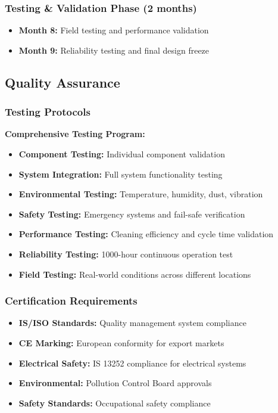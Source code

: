 \documentclass[11pt,a4paper]{article}
\begin{document}
\subsubsection{Testing \& Validation Phase (2 months)}
\begin{itemize}[leftmargin=2em]
    \item \textbf{Month 8:} Field testing and performance validation
    \item \textbf{Month 9:} Reliability testing and final design freeze
\end{itemize}

\subsection{Quality Assurance}

\subsubsection{Testing Protocols}
\begin{success}
\textbf{Comprehensive Testing Program:}
\begin{itemize}
    \item \textbf{Component Testing:} Individual component validation
    \item \textbf{System Integration:} Full system functionality testing
    \item \textbf{Environmental Testing:} Temperature, humidity, dust, vibration
    \item \textbf{Safety Testing:} Emergency systems and fail-safe verification
    \item \textbf{Performance Testing:} Cleaning efficiency and cycle time validation
    \item \textbf{Reliability Testing:} 1000-hour continuous operation test
    \item \textbf{Field Testing:} Real-world conditions across different locations
\end{itemize}
\end{success}

\subsubsection{Certification Requirements}
\begin{itemize}[leftmargin=2em]
    \item \textbf{IS/ISO Standards:} Quality management system compliance
    \item \textbf{CE Marking:} European conformity for export markets
    \item \textbf{Electrical Safety:} IS 13252 compliance for electrical systems
    \item \textbf{Environmental:} Pollution Control Board approvals
    \item \textbf{Safety Standards:} Occupational safety compliance
\end{itemize}
\end{document}
